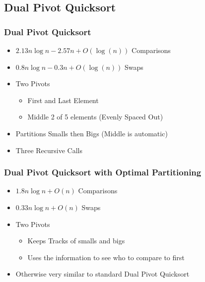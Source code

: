 		\subsection{Dual Pivot Quicksort}
			\begin{frame}
				\frametitle{Dual Pivot Quicksort}
				\begin{itemize}
					\item<+-> $2.13n \log n - 2.57n + O(\log(n))$ Comparisons
					\item<+-> $0.8n \log n -0.3n + O(\log(n))$ Swaps
					\item<+-> Two Pivots
					\begin{itemize}
						\item<+-> First and Last Element
						\item<+-> Middle 2 of 5 elements (Evenly Spaced Out)
					\end{itemize}
					\item<+-> Partitions Smalls then Bigs (Middle is automatic)
					\item<+-> Three Recursive Calls
				\end{itemize}
				\vfill
				\phantom{ }\cite{Wild:2012:ACA:2404160.2404231}
			\end{frame}

			\begin{frame}
				\frametitle{Dual Pivot Quicksort with Optimal Partitioning}
				\begin{itemize}
					\item<+-> $1.8n \log n + O(n)$ Comparisons
					\item<+-> $0.33n \log n + O(n)$ Swaps
					\item<+-> Two Pivots
					\begin{itemize}
						\item<+-> Keeps Tracks of smalls and bigs
						\item<+-> Uses the information to see who to compare to first
					\end{itemize}
					\item<+-> Otherwise very similar to standard Dual Pivot Quicksort
				\end{itemize}
				\vfill
				\phantom{ }\cite{Aumuller:2013:OPD:2525857.2525862}
			\end{frame}


